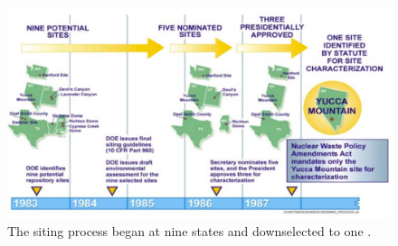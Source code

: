 \begin{figure}[htbp!]
  \begin{center}
    \includegraphics{nine_sites_to_one.eps}
  \end{center}
  \caption{The siting process began at nine states and downselected to one 
    \cite{peters_what_2013}.}
  \label{fig:nine_states_to_one}
\end{figure}

